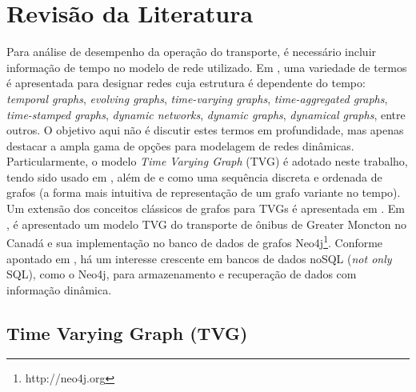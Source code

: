 
\chapter{Revisão da Literatura}\label{cap:revisaodaliteratura}

\textcolor{courb2020}{
Para análise de desempenho da operação do transporte, é necessário incluir informação de tempo no modelo de rede utilizado. Em \cite{hol:12}, uma variedade de termos é apresentada para designar redes cuja estrutura é dependente do tempo: \emph{temporal graphs}, \emph{evolving graphs}, \emph{time-varying graphs}, \emph{time-aggregated graphs}, \emph{time-stamped graphs}, \emph{dynamic networks}, \emph{dynamic graphs}, \emph{dynamical graphs}, entre outros. O objetivo aqui não é discutir estes termos em profundidade, mas apenas destacar a ampla gama de opções para modelagem de redes dinâmicas. Particularmente, o modelo \emph{Time Varying Graph} (TVG) é adotado neste trabalho, tendo sido usado em \cite{sant:09}, além de \cite{tang:10} e \cite{lat:10} como uma sequência discreta e ordenada de grafos (a forma mais intuitiva de representação de um grafo variante no tempo). Um extensão dos conceitos clássicos de grafos para TVGs é apresentada em \cite{lat:12}. Em \cite{wach:19}, é apresentado um modelo TVG do transporte de ônibus de Greater Moncton no Canadá e sua implementação no banco de dados de grafos Neo4j\footnote{http://neo4j.org}. Conforme apontado em \cite{vick:10}, há um interesse crescente em bancos de dados noSQL (\emph{not only} SQL), como o Neo4j, para armazenamento e recuperação de dados com informação dinâmica.
}

\section{Time Varying Graph (TVG)} \label{sec:fund}

